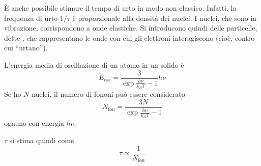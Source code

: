 È anche possibile stimare il tempo di urto in modo non classico.
Infatti, la frequenza di urto $1/\tau$ è proporzionale alla densità dei nuclei.
I nuclei, che sono in vibrazione, corrispondono a onde elastiche.
Si introducono quindi delle particelle, dette , che rappresentano le onde con cui gli elettroni interagiscono (cioè, contro cui ``urtano'').

L'energia media di oscillazione di un atomo in un solido è
\begin{equation}
    E_\text{osc} = \frac{3}{\exp{\frac{h \nu}{k_B T}} - 1} h \nu
\end{equation}
Se ho $N$ nuclei, il numero di fononi può essere considerato
\begin{equation}
    N_\text{fon} = \frac{3 N}{\exp{\frac{h \nu}{k_B T}} - 1}
\end{equation}
ognuno con energia $h \nu$.

$\tau$ si stima quindi come
\begin{equation}
    \tau \propto \frac{1}{N_\text{fon}}
\end{equation}
